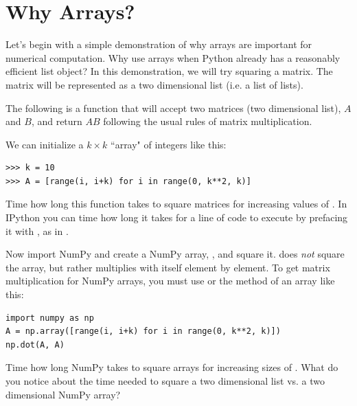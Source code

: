 \label{lab:NumPyArrays}

\section*{Why Arrays?}
Let's begin with a simple demonstration of why arrays are important for numerical computation.
Why use arrays when Python already has a reasonably efficient list object?
In this demonstration, we will try squaring a matrix.
The matrix will be represented as a two dimensional list (i.e. a list of lists).

The following is a function that will accept two matrices (two dimensional list), $A$ and $B$, and return $AB$ following the usual rules of matrix multiplication.

We can initialize a $k \times k$ ``array" of integers like this:
\begin{lstlisting}
>>> k = 10
>>> A = [range(i, i+k) for i in range(0, k**2, k)]
\end{lstlisting}

\begin{problem}
Time how long this function takes to square matrices for increasing values of .
In IPython you can time how long it takes for a line of code to execute by prefacing it with , as in .

Now import NumPy and create a NumPy array, , and square it.
 does \emph{not} square the array, but rather multiplies  with itself element by element.
To get matrix multiplication for NumPy arrays, you must use  or the  method of an array like this:
\begin{lstlisting}
import numpy as np
A = np.array([range(i, i+k) for i in range(0, k**2, k)])
np.dot(A, A)
\end{lstlisting}
Time how long NumPy takes to square arrays for increasing sizes of .
What do you notice about the time needed to square a two dimensional list vs. a two dimensional NumPy array?
\end{problem}

